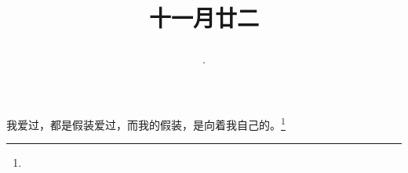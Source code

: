 \title{\date[d=3,m=1,y=2024][year:cn-y,年,month:cn,day:cn,日,·,weekday]·十一月廿二 }
我爱过，都是假装爱过，而我的假装，是向着我自己的。\footnote{ }

